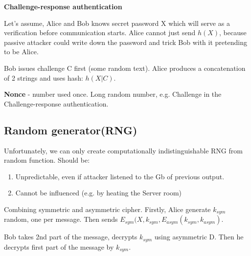 \begin{example}
	\textbf{Challenge-response authentication}

	Let's assume, Alice and Bob knows secret password X which will serve as a verification before communication starts.
	Alice cannot just send $h(X)$, because passive attacker could write down the password and trick Bob with it pretending to be Alice.

	Bob issues challenge C first (some random text). Alice produces a concatenation of 2 strings and uses hash: $h(X | C)$.
\end{example}

\begin{definition}
	\textbf{Nonce} - number used once. Long random number, e.g. Challenge in the Challenge-response authentication.
\end{definition}


\subsection{Random generator(RNG)}
Unfortunately, we can only create computationally indistinguishable RNG from random function. Should be:
\begin{enumerate}
	\item Unpredictable, even if attacker listened to the Gb of previous output.
	\item Cannot be influenced (e.g. by heating the Server room)
\end{enumerate}

Combining symmetric and asymmetric cipher. Firstly, Alice generate $k_{sym}$ random, one per message.
Then sends $E_{sym}(X, k_{sym}, E_{asym}(k_{sym}, k_{asym}) $.

Bob takes 2nd part of the message, decrypts $k_{sym}$ using asymmetric D. Then he decrypts first part of the message by $k_{sym}$.

